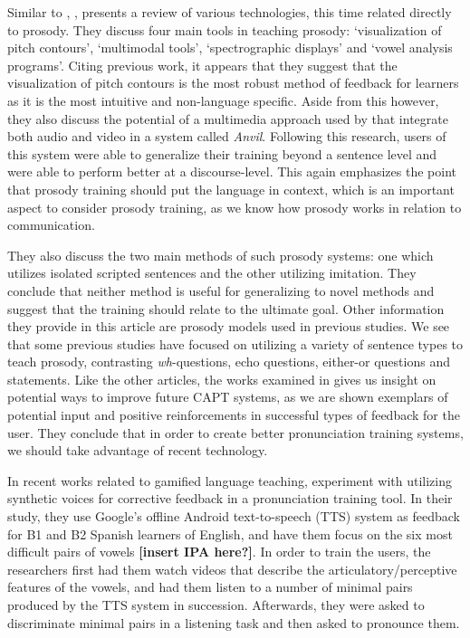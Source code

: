 \documentclass
[
    a4paper,
    twoside,
    12pt
]
{report}
\begin{document}
Similar to \textcite{eskenazi2009}, \textcite{chun2008}, presents a
review of various technologies, this time related directly to prosody.
They discuss four main tools in teaching prosody: `visualization of
pitch contours', `multimodal tools', `spectrographic displays' and
`vowel analysis programs'. Citing previous work, it appears that they
suggest that the visualization of pitch contours is the most robust
method of feedback for learners as it is the most intuitive and
non-language specific. Aside from this however, they also discuss the
potential of a multimedia approach used by \textcite{hardison2005} that
integrate both audio and video in a system called \textit{Anvil}.
Following this research, users of this system were able to generalize
their training beyond a sentence level and were able to perform better
at a discourse-level. This again emphasizes the point that prosody
training should put the language in context, which is an important
aspect to consider prosody training, as we know how prosody works in
relation to communication.

They also discuss the two main methods of such prosody systems: one
which utilizes isolated scripted sentences and the other utilizing
imitation. They conclude that neither method is useful for generalizing
to novel methods and suggest that the training should relate to the
ultimate goal. Other information they provide in this article are
prosody models used in previous studies. We see that some previous
studies have focused on utilizing a variety of sentence types to teach
prosody, contrasting \textit{wh}-questions, echo questions, either-or
questions and statements. Like the other articles, the works examined in
\textcite{chun2008} gives us insight on potential ways to improve future
CAPT systems, as we are shown exemplars of potential input and positive
reinforcements in successful types of feedback for the user. They
conclude that in order to create better pronunciation training systems,
we should take advantage of recent technology.

In recent works related to gamified language teaching,
\parencite{tejedor-garcia2017} experiment with utilizing synthetic
voices for corrective feedback in a pronunciation training tool. In
their study, they use Google's offline Android text-to-speech (TTS)
system as feedback for B1 and B2 Spanish learners of English, and have
them focus on the six most difficult pairs of vowels \textbf{{[}insert
IPA here?{]}}. In order to train the users, the researchers first had
them watch videos that describe the articulatory/perceptive features of
the vowels, and had them listen to a number of minimal pairs produced by
the TTS system in succession. Afterwards, they were asked to
discriminate minimal pairs in a listening task and then asked to
pronounce them.
\end{document}
